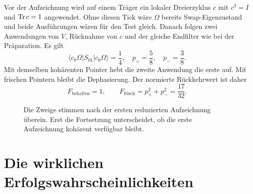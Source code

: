 Vor der Aufzeichnung wird auf einem Träger ein lokaler Dreierzyklus $c$ mit $c^3=I$ und $\operatorname{Tr} c=1$ angewendet. Ohne diesen Tick wäre $\Omega$ bereits Swap-Eigenzustand und beide Ausführungen wären für den Test gleich. Danach folgen zwei Anwendungen von $V$, Rücknahme von $c$ und der gleiche Endfilter wie bei der Präparation. Es gilt
\begin{equation}
\langle c_0\Omega|S_{01}|c_0\Omega\rangle=\frac14,
\quad p_+=\frac58,\quad p_-=\frac38.
\end{equation}
Mit demselben kohärenten Pointer hebt die zweite Anwendung die erste auf. Mit frischen Pointern bleibt die Dephasierung. Der normierte Rückkehrwert ist daher
\begin{equation}
F_{\mathrm{behalten}}=1,\qquad
F_{\mathrm{frisch}}=p_+^2+p_-^2=\frac{17}{32}.
\label{eq:originalecho}
\end{equation}

\begin{figure}[H]\centering
{}
\caption{Die Zweige stimmen nach der ersten reduzierten Aufzeichnung überein. Erst die Fortsetzung unterscheidet, ob die erste Aufzeichnung kohärent verfügbar bleibt.}
\end{figure}

\section{Die wirklichen Erfolgswahrscheinlichkeiten}


